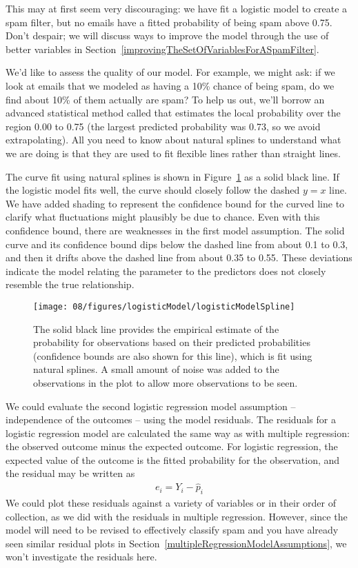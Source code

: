 This may at first seem very discouraging: we have fit a logistic model to create a spam filter, but no emails have a fitted probability of being spam above 0.75. Don't despair; we will discuss ways to improve the model through the use of better variables in Section~\ref{improvingTheSetOfVariablesForASpamFilter}.

We'd like to assess the quality of our model. For example, we might ask: if we look at emails that we modeled as having a 10\% chance of being spam, do we find about 10\% of them actually are spam? To help us out, we'll borrow an advanced statistical method called  that estimates the local probability over the region 0.00 to 0.75 (the largest predicted probability was 0.73, so we avoid extrapolating). All you need to know about natural splines to understand what we are doing is that they are used to fit flexible lines rather than straight lines.

The curve fit using natural splines is shown in Figure~\ref{logisticModelSpline} as a solid black line. If the logistic model fits well, the curve should closely follow the dashed $y=x$ line. We have added shading to represent the confidence bound for the curved line to clarify what fluctuations might plausibly be due to chance. Even with this confidence bound, there are weaknesses in the first model assumption. The solid curve and its confidence bound dips below the dashed line from about 0.1 to 0.3, and then it drifts above the dashed line from about 0.35 to 0.55. These deviations indicate the model relating the parameter to the predictors does not closely resemble the true relationship.

\begin{figure}
\centering
\texttt{[image: 08/figures/logisticModel/logisticModelSpline]}
\caption{The solid black line provides the empirical estimate of the probability for observations based on their predicted probabilities (confidence bounds are also shown for this line), which is fit using natural splines. A small amount of noise was added to the observations in the plot to allow more observations to be seen.}
\label{logisticModelSpline}
\end{figure}

We could evaluate the second logistic regression model assumption -- independence of the outcomes -- using the model residuals. The residuals for a logistic regression model are calculated the same way as with multiple regression: the observed outcome minus the expected outcome. For logistic regression, the expected value of the outcome is the fitted probability for the observation, and the residual may be written as
\begin{align*}
e_i = Y_i - \hat{p}_i
\end{align*}
We could plot these residuals against a variety of variables or in their order of collection, as we did with the residuals in multiple regression. However, since the model will need to be revised to effectively classify spam and you have already seen similar residual plots in Section~\ref{multipleRegressionModelAssumptions}, we won't investigate the residuals here.


